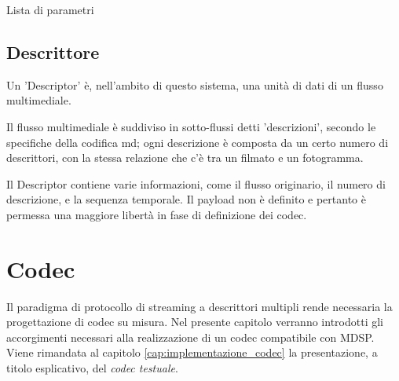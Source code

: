 Lista di parametri

\subsection{Descrittore}


Un 'Descriptor' è, nell'ambito di questo sistema, una unità di dati di un flusso multimediale.

Il flusso multimediale è suddiviso in sotto-flussi detti 'descrizioni', secondo le specifiche della codifica md; ogni descrizione è composta da un certo numero di descrittori, con la stessa relazione che c'è tra un filmato e un fotogramma.

Il Descriptor contiene varie informazioni, come il flusso originario, il numero di descrizione, e la sequenza temporale. Il payload non è definito e pertanto è permessa una maggiore libertà in fase di definizione dei codec.







\section{Codec}
\label{cap:descrizione_codec}
Il paradigma di protocollo di streaming a descrittori multipli rende
necessaria la progettazione di codec su misura. Nel presente capitolo
verranno introdotti gli accorgimenti necessari alla realizzazione di un codec
compatibile con MDSP. Viene rimandata al capitolo
\ref{cap:implementazione_codec} la presentazione, a titolo esplicativo, del
\emph{codec testuale}.

